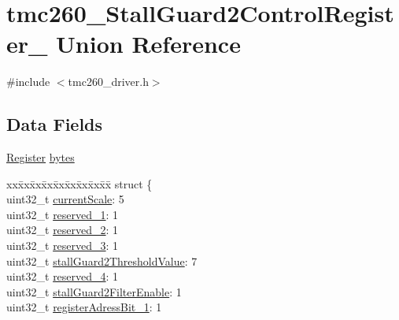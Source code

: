 \hypertarget{uniontmc260___stall_guard2_control_register__}{}\section{tmc260\+\_\+\+Stall\+Guard2\+Control\+Register\+\_\+ Union Reference}
\label{uniontmc260___stall_guard2_control_register__}


{\ttfamily \#include $<$tmc260\+\_\+driver.\+h$>$}

\subsection*{Data Fields}
\begin{DoxyCompactItemize}
\item 
\mbox{\hyperlink{tmc260__driver_8h_a280b01a3b5bb4294fcee278b00c030d6}{Register}} \mbox{\hyperlink{uniontmc260___stall_guard2_control_register___a445b72174063a88455cd86c22d77d03f}{bytes}}
\item 
\begin{tabbing}
xx\=xx\=xx\=xx\=xx\=xx\=xx\=xx\=xx\=\kill
struct \{\\
\>uint32\_t \mbox{\hyperlink{uniontmc260___stall_guard2_control_register___af3aaac138d1ebeba8461dc779f2fde1e}{currentScale}}: 5\\
\>uint32\_t \mbox{\hyperlink{uniontmc260___stall_guard2_control_register___aa5d9ea4624bf97017a821a70177c6bdb}{reserved\_1}}: 1\\
\>uint32\_t \mbox{\hyperlink{uniontmc260___stall_guard2_control_register___a50b223df92282d04dfa46306b53a9905}{reserved\_2}}: 1\\
\>uint32\_t \mbox{\hyperlink{uniontmc260___stall_guard2_control_register___af8407645db2d0329264f3c6d0cbd6dd1}{reserved\_3}}: 1\\
\>uint32\_t \mbox{\hyperlink{uniontmc260___stall_guard2_control_register___a9bdf286986dabc8efc07fc3a91f2c006}{stallGuard2ThresholdValue}}: 7\\
\>uint32\_t \mbox{\hyperlink{uniontmc260___stall_guard2_control_register___aaf2eb7a7615ec891d7e5a9d49d433f37}{reserved\_4}}: 1\\
\>uint32\_t \mbox{\hyperlink{uniontmc260___stall_guard2_control_register___ac982627270dc352b27db00b232df6108}{stallGuard2FilterEnable}}: 1\\
\>uint32\_t \mbox{\hyperlink{uniontmc260___stall_guard2_control_register___a8e58d0701295971bc3d890f5107f8aa5}{registerAdressBit\_1}}: 1\\

\end{tabbing}
\end{DoxyCompactItemize}
